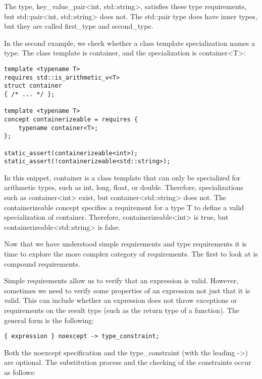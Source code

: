 The type, key\_value\_pair<int, std::string>, satisfies these type requirements, but std::pair<int, std::string> does not. The std::pair type does have inner types, but they are called first\_type and second\_type.

In the second example, we check whether a class template specialization names a type. The class template is container, and the specialization is container<T>:

\begin{lstlisting}[style=styleCXX]
template <typename T>
requires std::is_arithmetic_v<T>
struct container
{ /* ... */ };

template <typename T>
concept containerizeable = requires {
	typename container<T>;
};

static_assert(containerizeable<int>);
static_assert(!containerizeable<std::string>);
\end{lstlisting}

In this snippet, container is a class template that can only be specialized for arithmetic types, such as int, long, float, or double. Therefore, specializations such as container<int> exist, but container<std::string> does not. The containerizeable concept specifies a requirement for a type T to define a valid specialization of container. Therefore, containerizeable<int> is true, but containerizeable<std::string> is false.

Now that we have understood simple requirements and type requirements it is time to explore the more complex category of requirements. The first to look at is compound requirements.


Simple requirements allow us to verify that an expression is valid. However, sometimes we need to verify some properties of an expression not just that it is valid. This can include whether an expression does not throw exceptions or requirements on the result type (such as the return type of a function). The general form is the following:

\begin{lstlisting}[style=styleCXX]
{ expression } noexcept -> type_constraint;
\end{lstlisting}

Both the noexcept specification and the type\_constraint (with the leading ->) are optional. The substitution process and the checking of the constraints occur as follows:

